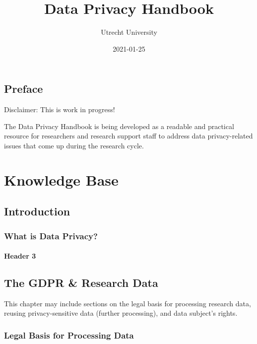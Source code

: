 \documentclass[
]{book}
\title{Data Privacy Handbook}
\author{Utrecht University}
\date{2021-01-25}
\begin{document}
\maketitle

{
\setcounter{tocdepth}{1}
\tableofcontents
}
\hypertarget{preface}{%
\chapter*{Preface}\label{preface}}

Disclaimer: This is work in progress!

The Data Privacy Handbook is being developed as a readable and practical resource for researchers and research support staff to address data privacy-related issues that come up during the research cycle.

\hypertarget{part-knowledge-base}{%
\part{Knowledge Base}\label{part-knowledge-base}}

\hypertarget{intro}{%
\chapter{Introduction}\label{intro}}

\hypertarget{what-is-data-privacy}{%
\section{What is Data Privacy?}\label{what-is-data-privacy}}

\hypertarget{header-3}{%
\subsection{Header 3}\label{header-3}}

\hypertarget{gdpr}{%
\chapter{The GDPR \& Research Data}\label{gdpr}}

This chapter may include sections on the legal basis for processing research data, reusing privacy-sensitive data (further processing), and data subject's rights.

\hypertarget{legal-basis-for-processing-data}{%
\section{Legal Basis for Processing Data}\label{legal-basis-for-processing-data}}
\end{document}

